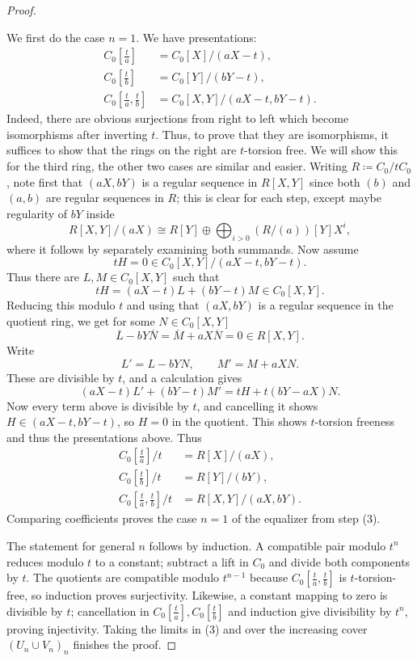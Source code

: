 \documentclass[10pt,twoside]{article}
\numberwithin{equation}{section}
\theoremstyle{plain}
\theoremstyle{definition}
\begin{document}
\begin{proof}
\begin{enumerate}
\end{enumerate}
We first do the case \(n=1\). We have presentations:
    \begin{align*}
    C_0[\frac t a]&=C_0[X]/(aX-t),\\
    C_0[\frac t b]&=C_0[Y]/(bY-t),\\
    C_0[\frac t a,\frac t b]&=C_0[X,Y]/(aX-t,bY-t).
    \end{align*}
	Indeed, there are obvious surjections from right to left which become isomorphisms after inverting \(t\). Thus, to prove that they are isomorphisms, it suffices to show that the rings on the right are \(t\)-torsion free. We will show this for the third ring, the other two cases are similar and easier. Writing \(R\coloneqq C_0/tC_0\), note first that \((aX,bY)\) is a regular sequence in \(R[X,Y]\) since both \((b)\) and \((a,b)\) are regular sequences in \(R\); this is clear for each step, except maybe regularity of \(bY\) inside
\[R[X,Y]/(aX)\cong R[Y]\oplus \bigoplus_{i>0}(R/(a))[Y]X^i,\]
where it follows by separately examining both summands. Now assume\[tH=0\in C_0[X,Y]/(aX-t,bY-t).\] Thus there are \(L,M\in C_0[X,Y]\) such that
    \[tH=(aX-t)L+(bY-t)M\in C_0[X,Y].\]
Reducing this modulo \(t\) and using that \((aX,bY)\) is a regular sequence in the quotient ring, we get for some \(N\in C_0[X,Y]\)
\[\overline L-bY\overline N = \overline M+aX\overline N=0\in R[X,Y].\]
Write
\[L' = L-bY N,\qquad  M'=M+aX N.\]
These are divisible by \(t\), and a calculation gives
    \[(aX-t)L'+(bY-t)M'=tH+t(bY-aX)N.\]
Now every term above is divisible by \(t\), and cancelling it shows \(H\in (aX-t, bY-t)\), so \(H=0\) in the quotient. This shows \(t\)-torsion freeness and thus the presentations above. Thus
    \begin{align*}
    C_0[\frac t a]/t&=R[X]/(aX),\\
    C_0[\frac t b]/t&=R[Y]/(bY),\\
    C_0[\frac t a,\frac t b]/t&=R[X,Y]/(aX,bY).
    \end{align*}
Comparing coefficients proves the case \(n=1\) of the equalizer from step (3).\par
The statement for general \(n\) follows by induction. A compatible pair modulo \(t^n\) reduces modulo \(t\) to a constant; subtract a lift in \(C_0\) and divide both components by \(t\). The quotients are compatible modulo \(t^{n-1}\) because \(C_0[\frac t a,\frac t b]\) is \(t\)-torsion-free, so induction proves surjectivity. Likewise, a constant mapping to zero is divisible by \(t\); cancellation in \(C_0[\frac t a],\allowbreak C_0[\frac t b]\) and induction give divisibility by \(t^n\), proving injectivity. Taking the limits in (3) and over the increasing cover \((U_n\cup V_n)_n\) finishes the proof.

\end{proof}
\end{document}

